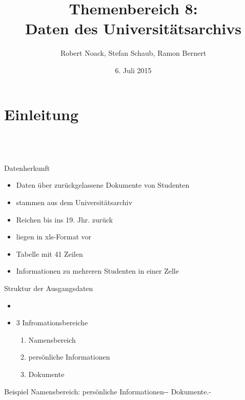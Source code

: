 \documentclass[12pt]{beamer}
\author{Robert Noack, Stefan Schaub, Ramon Bernert}
\title{\textbf{Themenbereich 8: \\Daten des Universitätsarchivs}}
\date{6. Juli 2015}
\begin{document}
\begin{large}
\section*{}
\begin{frame}
\titlepage
\end{frame}

\begin{frame}
\tableofcontents
\end{frame}

\section{Einleitung}
 \subsection*{~}
\begin{frame}{Datenherkunft}
 \begin{itemize}
  \item Daten über zurückgelassene Dokumente von Studenten
  \item stammen aus dem Universitätsarchiv
  \item Reichen bis ins 19. Jhr. zurück
  \item liegen in xls-Format vor
  \item Tabelle mit 41 Zeilen
  \item Informationen zu mehreren Studenten in einer Zelle
 \end{itemize}

\end{frame}

\begin{frame}{Struktur der Ausgangsdaten}
\begin{itemize}
\item 
\item 3 Infromationsbereiche
 \begin{enumerate}
  \item Namensbereich
  \item persönliche Informationen
  \item Dokumente
 \end{enumerate}
\end{itemize}

 
 \vspace*{\fill}
 \begin{block}{Beispiel}
 \normalsize Namensbereich: persönliche Informationen-{}- Dokumente.-
 \end{block}
\end{frame} 



\end{large}
\end{document}
